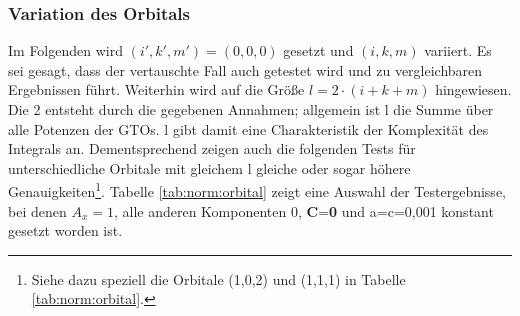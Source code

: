 \subsubsection{Variation des Orbitals}
%
Im Folgenden wird $(i',k',m')=(0,0,0)$ 
gesetzt und $(i,k,m)$ variiert. Es sei gesagt, dass der vertauschte Fall auch 
getestet wird und zu vergleichbaren Ergebnissen führt.  Weiterhin wird auf die 
Größe $l=2\cdot (i+k+m) $ hingewiesen. Die 2 entsteht durch die 
gegebenen Annahmen; allgemein ist l die Summe über alle Potenzen der GTOs. l 
gibt damit eine Charakteristik der Komplexität des Integrals an. 
Dementsprechend zeigen auch die folgenden Tests für unterschiedliche Orbitale 
mit gleichem l gleiche oder sogar höhere 
Genauigkeiten\footnote{Siehe dazu speziell die Orbitale 
(1,0,2) und (1,1,1) in Tabelle 
\ref{tab:norm:orbital}.}. Tabelle 
\ref{tab:norm:orbital} zeigt 
eine Auswahl der Testergebnisse, bei denen $A_x=1$, alle anderen Komponenten 0, 
\textbf{C}=\textbf{0} und a=c=0,001 konstant gesetzt worden ist.
%
